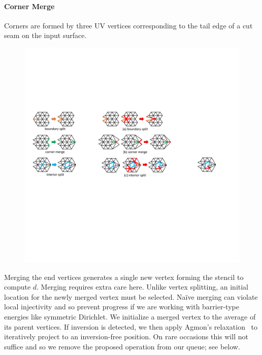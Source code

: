 \paragraph{Corner Merge}
Corners are formed by three UV vertices corresponding to the tail edge of a cut seam on the input surface. 
\begin{figure}
  \begin{center}
  \vspace{-5mm}
    \includegraphics[width=1\linewidth]{fig/cMerge}
  \vspace{-4mm}
  \end{center}
\end{figure}
Merging the end vertices generates a single new vertex forming the stencil to compute $d$. Merging requires extra care here. Unlike vertex splitting, an initial location for the newly merged vertex must be selected. Na\"ive merging can violate local injectivity and so prevent progress if we are working with barrier-type energies like symmetric Dirichlet. We initialize a merged vertex to the average of its parent vertices. If inversion is detected, we then apply Agmon's relaxation~ to iteratively project to an inversion-free position. On rare occasions this will not suffice and so we remove the proposed operation from our queue; see below.

